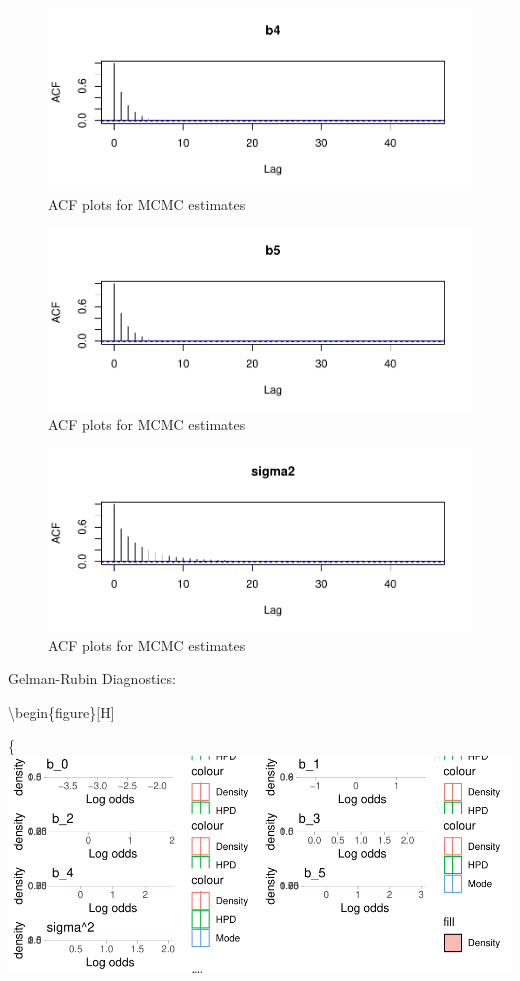\documentclass[12pt]{article}
\begin{document}
\begin{figure}[H]

{\centering \includegraphics[width=0.5\linewidth]{bookdown_report_files/figure-latex/acf-5} 

}

\caption{ACF plots for MCMC estimates}\label{fig:acf-5}
\end{figure}
\begin{figure}[H]

{\centering \includegraphics[width=0.5\linewidth]{bookdown_report_files/figure-latex/acf-6} 

}

\caption{ACF plots for MCMC estimates}\label{fig:acf-6}
\end{figure}
\begin{figure}[H]

{\centering \includegraphics[width=0.5\linewidth]{bookdown_report_files/figure-latex/acf-7} 

}

\caption{ACF plots for MCMC estimates}\label{fig:acf-7}
\end{figure}

Gelman-Rubin Diagnostics:

\textbackslash begin\{figure\}{[}H{]}

\{\centering \includegraphics{bookdown_report_files/figure-latex/postdens-1}
\end{document}
